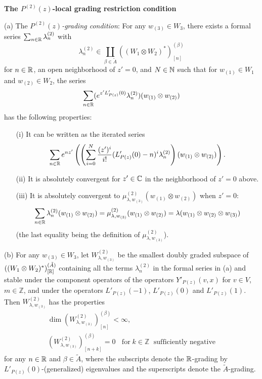 \documentclass[12pt]{article}
\begin{document}
\begin{description}

\item{\bf The $P^{(2)}(z)$-local grading restriction condition}

(a) The {\em $P^{(2)}(z)$-grading condition}: For any $w_{(3)}\in
W_3$,  there exists  a formal series $\sum_{n\in \mathbb{R}}\lambda^{(2)}_{n}$ 
with
\[
\lambda^{(2)}_{n}\in \coprod_{\beta\in \tilde{A}}
((W_{1}\otimes W_{2})^{*})_{[n]}^{(\beta)}
\]
for $n\in \mathbb{R}$, an open neighborhood of $z'=0$, and $N \in \mathbb{N}$
such that for $w_{(1)}\in W_{1}$ and $w_{(2)}\in W_{2}$,
the series 
\[
\sum_{n\in \mathbb{R}}(e^{z'L'_{P(z)}(0)}\lambda^{(2)}_{n})(w_{(1)}\otimes w_{(2)})
\]
has the following properties:
\begin{enumerate}

\item[(i)] It can be written as the iterated series
\[
\sum_{n\in \mathbb{R}}e^{nz'}\left(\left(\sum_{i=0}^{N}\frac{(z')^{i}}{i!}
(L'_{P(z)}(0)-n)^{i}\lambda^{(2)}_{n}
\right)(w_{(1)}\otimes 
w_{(2)})\right).
\]

\item[(ii)] It is absolutely convergent for $z'\in \mathbb{C}$ in the neighborhood of
$z'=0$ above.

\item[(iii)] It is absolutely convergent to $\mu^{(2)}_{\lambda,
w_{(3)}}(w_{(1)}\otimes w_{(2)})$ when $z'=0$:
\[
\sum_{n\in \mathbb{R}}\lambda^{(2)}_{n}(w_{(1)}\otimes w_{(2)})
=\mu^{(2)}_{\lambda, w_{(3)}}(w_{(1)}\otimes w_{(2)})
=\lambda(w_{(1)}\otimes w_{(2)}\otimes w_{(3)})
\]
(the last equality being the definition of $\mu^{(2)}_{\lambda, w_{(3)}}$).

\end{enumerate}

(b) For any $w_{(3)}\in W_3$, let $W^{(2)}_{\lambda, w_{(3)}}$ be the
smallest doubly graded subspace
of $((W_1\otimes W_2)^{*})_{[\mathbb{R}]}^{(\tilde{A})}$ containing all the
terms $\lambda^{(2)}_{n}$ in the formal series in (a) and stable under
the component operators  of the operators
$Y'_{P(z)}(v, x)$ for $v\in V$, $m\in {\mathbb Z}$, and under the
operators $L'_{P(z)}(-1)$, $L'_{P(z)}(0)$ and $L'_{P(z)}(1)$.   Then
$W^{(2)}_{\lambda, w_{(3)}}$ has the properties
\begin{eqnarray*}
&\dim(W^{(2)}_{\lambda, w_{(3)}})^{(\beta)}_{[n]}<\infty,&\\
&(W^{(2)}_{\lambda, w_{(3)}})^{(\beta)}_{[n+k]}=0\;\;\mbox{ for
}\;k\in {\mathbb Z} \;\mbox{ sufficiently negative}&
\end{eqnarray*}
for any $n\in \mathbb{R}$ and $\beta\in \tilde A$, where the
subscripts denote the $\mathbb{R}$-grading by
$L'_{P(z)}(0)$-(generalized) eigenvalues and the superscripts denote
the $\tilde A$-grading.

\end{description}
\end{document}
